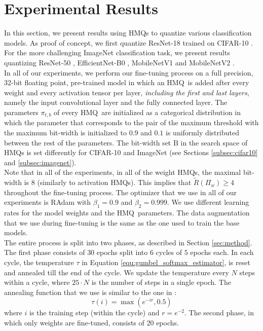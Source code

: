 \documentclass{article}
\newcommand{\bitset}{\mathrm{B}}
\newcommand{\qb}{HMQ}
\begin{document}
 \section{Experimental Results}\label{se:experimental}
In this section, we present results using \qb s to quantize various classification models.
As proof of concept, we first quantize ResNet-18 \cite{he2016deep} trained on \mbox{CIFAR-10} \cite{krizhevsky2009learning}.
For the more challenging ImageNet \cite{deng2009imagenet} classification task, we present results quantizing ResNet-50 \cite{he2016deep}, EfficientNet-B0 \cite{tan2019efficientnet}, MobileNetV1 \cite{howard2017mobilenets} and MobileNetV2 \cite{sandler2018mobilenetv2}.
\\

In all of our experiments, we perform our fine-tuning process on a full precision, \mbox{32-bit} floating point, pre-trained model in which an \qb\ is added after every weight and every activation tensor per layer, \textit{including the first and last layers}, namely the input convolutional layer and the fully connected layer.  
The parameters $\pi_{t, b}$ of every \qb\ are initialized as a categorical distribution in which the parameter that corresponds to the pair of the maximum threshold with the maximum bit-width is initialized to $0.9$ and $0.1$ is uniformly distributed between the rest of the parameters.
The bit-width set $\bitset$ in the search space of \qb s is set differently for CIFAR-10 and ImageNet (see Sections \ref{subsec:cifar10} and \ref{subsec:imagenet}).\\

Note that in all of the experiments, in all of the weight \qb s, the maximal bit-width is 8 (similarly to activation \qb s). 
This implies that $\tilde{R}(\Pi_w)\geq 4$  throughout the fine-tuning process.
The optimizer that we use in all of our experiments is RAdam \cite{liu2019variance} with $\beta_1=0.9$ and $\beta_2=0.999$.
We use different learning rates for the model weights and the \qb\ parameters.
The data augmentation that we use during fine-tuning is the same as the one used to train the base models.
\\

The entire process is split into two phases, as described in Section \ref{sec:method}.
The first phase consists of $30$ epochs split into $6$ cycles of $5$ epochs each. 
In each cycle, the temperature $\tau$ in Equation \ref{equ:gumbel_softmax_estimator}, is reset and annealed till the end of the cycle.
We update the temperature every $N$ steps within a cycle, where $25\cdot N$ is the number of steps in a single epoch.
The annealing function that we use is similar to the one in \cite{jang2016categorical}:
\begin{equation}\label{eq:gumbel_temp}
\tau(i)=\max(e^{-ir},0.5)
\end{equation}
where $i$ is the training step (within the cycle) and $r=e^{-2}$.
The second phase, in which only weights are fine-tuned, consists of 20 epochs.\\
\end{document}
